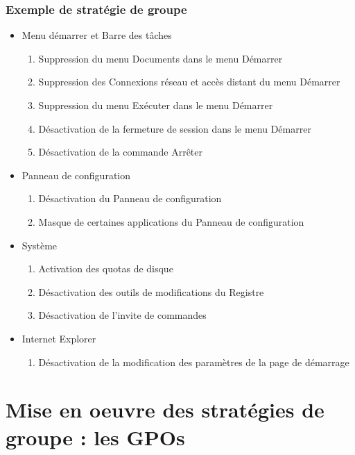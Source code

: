 \documentclass{beamer}
\begin{document}
  \begin{frame}
   \frametitle{Exemple de stratégie de groupe}
   \begin{itemize}
    \item Menu démarrer et Barre des tâches
    \begin{enumerate}
     \item Suppression du menu Documents dans le menu Démarrer
     \item Suppression des Connexions réseau et accès distant du menu Démarrer
     \item Suppression du menu Exécuter dans le menu Démarrer
     \item Désactivation de la fermeture de session dans le menu Démarrer
     \item Désactivation de la commande Arrêter
    \end{enumerate}
    \item Panneau de configuration
    \begin{enumerate}
     \item Désactivation du Panneau de configuration 
     \item Masque de certaines applications du Panneau de configuration
    \end{enumerate}
    \item Système
    \begin{enumerate}
     \item Activation des quotas de disque
     \item Désactivation des outils de modifications du Registre
     \item Désactivation de l'invite de commandes
    \end{enumerate}
    \item Internet Explorer
    \begin{enumerate}
     \item Désactivation de la modification des paramètres de la page de démarrage
    \end{enumerate}
   \end{itemize}
  \end{frame}  
  
  \section{Mise en oeuvre des stratégies de groupe : les GPOs}
  
\end{document}
